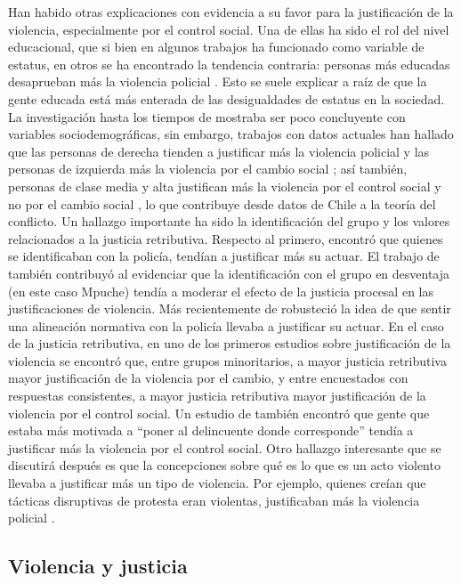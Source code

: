 \documentclass[12pt,twoside]{templates/facsothesis}
\begin{document}
Han habido otras explicaciones con evidencia a su favor para la justificación de la violencia, especialmente por el control social. Una de ellas ha sido el rol del nivel educacional, que si bien en algunos trabajos ha funcionado como variable de estatus, en otros se ha encontrado la tendencia contraria: personas más educadas desaprueban más la violencia policial \citep{Gamson1970, Thomas1977}. Esto se suele explicar a raíz de que la gente educada está más enterada de las desigualdades de estatus en la sociedad. La investigación hasta los tiempos de \citet{Thompson2004} mostraba ser poco concluyente con variables sociodemográficas, sin embargo, trabajos con datos actuales han hallado que las personas de derecha tienden a justificar más la violencia policial y las personas de izquierda más la violencia por el cambio social \citep{Puga2016, Gerber2017}; así también, personas de clase media y alta justifican más la violencia por el control social y no por el cambio social \citep{Gerber2017}, lo que contribuye desde datos de Chile a la teoría del conflicto. Un hallazgo importante ha sido la identificación del grupo y los valores relacionados a la justicia retributiva. Respecto al primero, \citet{Blumenthal1972} encontró que quienes se identificaban con la policía, tendían a justificar más su actuar. El trabajo de \citet{Gerber2017b} también contribuyó al evidenciar que la identificación con el grupo en desventaja (en este caso Mpuche) tendía a moderar el efecto de la justicia procesal en las justificaciones de violencia. Más recientemente de \citet{Bradford2017} robusteció la idea de que sentir una alineación normativa con la policía llevaba a justificar su actuar. En el caso de la justicia retributiva, en uno de los primeros estudios sobre justificación de la violencia se encontró que, entre grupos minoritarios, a mayor justicia retributiva mayor justificación de la violencia por el cambio, y entre encuestados con respuestas consistentes, a mayor justicia retributiva mayor justificación de la violencia por el control social. Un estudio de \citet{Puga2016} también encontró que gente que estaba más motivada a ``poner al delincuente donde corresponde'' tendía a justificar más la violencia por el control social. Otro hallazgo interesante que se discutirá después es que la concepciones sobre qué es lo que es un acto violento llevaba a justificar más un tipo de violencia. Por ejemplo, quienes creían que tácticas disruptivas de protesta eran violentas, justificaban más la violencia policial \citep{Blumenthal1972}.

\hypertarget{violencia-y-justicia}{%
\subsection{Violencia y justicia}\label{violencia-y-justicia}}
\end{document}
